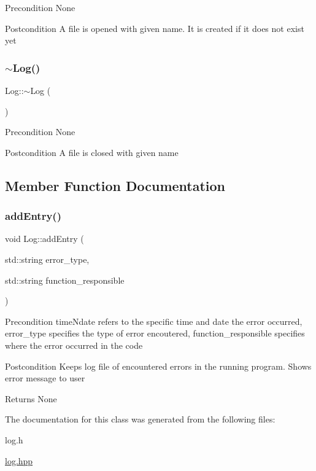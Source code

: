 \begin{DoxyPrecond}{Precondition}
None 
\end{DoxyPrecond}
\begin{DoxyPostcond}{Postcondition}
A file is opened with given name. It is created if it does not exist yet 
\end{DoxyPostcond}
\mbox{\label{class_log_a0fbfda88fbee5027c89f6eb121059360}} 
\subsubsection{\texorpdfstring{$\sim$\+Log()}{~Log()}}
{\footnotesize\ttfamily Log\+::$\sim$\+Log (\begin{DoxyParamCaption}{ }\end{DoxyParamCaption})}

\begin{DoxyPrecond}{Precondition}
None 
\end{DoxyPrecond}
\begin{DoxyPostcond}{Postcondition}
A file is closed with given name 
\end{DoxyPostcond}


\subsection{Member Function Documentation}
\mbox{\label{class_log_a1ccb79c34552336f3bd399b7c9b035d7}} 
\subsubsection{\texorpdfstring{add\+Entry()}{addEntry()}}
{\footnotesize\ttfamily void Log\+::add\+Entry (\begin{DoxyParamCaption}\item[{std\+::string}]{error\+\_\+type,  }\item[{std\+::string}]{function\+\_\+responsible }\end{DoxyParamCaption})}

\begin{DoxyPrecond}{Precondition}
time\+Ndate refers to the specific time and date the error occurred, error\+\_\+type specifies the type of error encoutered, function\+\_\+responsible specifies where the error occurred in the code 
\end{DoxyPrecond}
\begin{DoxyPostcond}{Postcondition}
Keeps log file of encountered errors in the running program. Shows error message to user 
\end{DoxyPostcond}
\begin{DoxyReturn}{Returns}
None 
\end{DoxyReturn}


The documentation for this class was generated from the following files\+:\begin{DoxyCompactItemize}
\item 
log.\+h\item 
\mbox{\hyperlink{log_8hpp}{log.\+hpp}}\end{DoxyCompactItemize}
